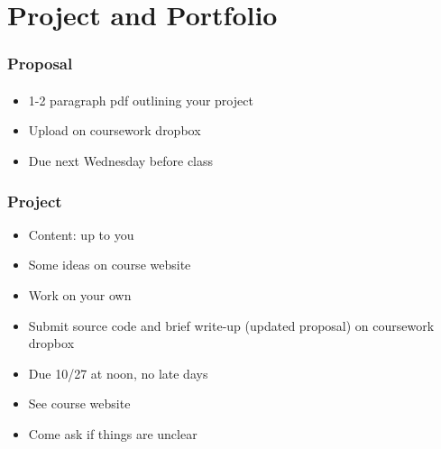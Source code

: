 \section{Project and Portfolio} %
\label{sec:project}




\begin{frame}\frametitle{Proposal}
    \framesubtitle{}

    \begin{itemize}
        \item 1-2 paragraph pdf outlining your project
        \item Upload on coursework dropbox
        \item Due next Wednesday before class
    \end{itemize}

\end{frame}

\begin{frame}\frametitle{Project}

    \begin{itemize}
        \item Content: up to you
        \item Some ideas on course website
        \item Work on your own
        \item Submit source code and brief write-up (updated proposal) on coursework dropbox
        \item Due 10/27 at noon, no late days
        \item See course website
        \item Come ask if things are unclear
    \end{itemize}

\end{frame}

